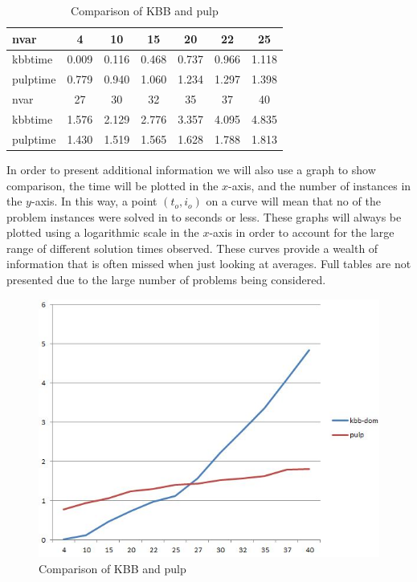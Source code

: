 \documentclass[a4paper,11pt]{article}
\begin{document}
\begin{table}[H]
\begin{center}
\begin{tabular}{l c c c c c c}
\hline
nvar&4&10&15&20&22&25\\
\hline
kbbtime&0.009&0.116&0.468&0.737&0.966&1.118\\
pulptime&0.779&0.940&1.060&1.234&1.297&1.398\\
\hline\hline
nvar&27&30&32&35&37&40\\
\hline
kbbtime&1.576&2.129&2.776&3.357&4.095&4.835\\
pulptime&1.430&1.519&1.565&1.628&1.788&1.813\\
\hline
\end{tabular}
\end{center}
\caption{Comparison of KBB and pulp\label{numtab}}
\end{table}



In order to present additional information we will also use a graph to show comparison, the time will be plotted in the $x$-axis, and the number of instances in the $y$-axis. In this way, a point $(t_o,i_o)$ on a curve will mean that no of the problem instances were solved in to seconds or less. These graphs will always be plotted using a logarithmic scale in the $x$-axis in order to account for the large range of different solution times observed. These curves provide a wealth of information that is often missed when just looking at averages. Full tables are not presented due to the large number of problems being considered.

\begin{figure}[H]
\begin{center}
\includegraphics[scale=0.6]{1}
\end{center}
\caption{Comparison of KBB and pulp \label{numfig}}
\end{figure}
\end{document}

